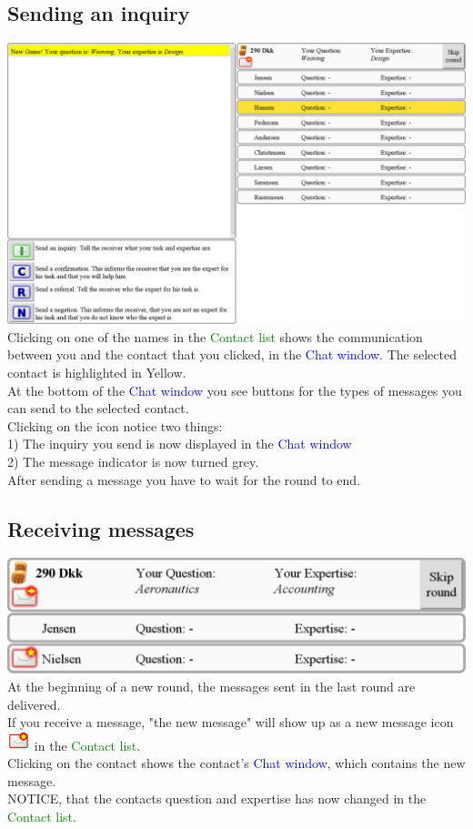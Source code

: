 \documentclass[a4paper,10pt]{article}
\begin{document}
 \subsection{Sending an inquiry}
 \includegraphics[width=\textwidth]{chatWindow.png}\\
Clicking on one of the names in the \textcolor{green}{Contact list} shows the communication between you and the contact that you clicked, in the \textcolor{blue}{Chat window}.
The selected contact is highlighted in Yellow. \\ 
At the bottom of the \textcolor{blue}{Chat window} you see buttons for the types of messages you can send to the selected contact.\\       
Clicking on the icon notice two things: \\
1) The inquiry you send is now displayed in the \textcolor{blue}{Chat window}\\
2) The message indicator is now turned grey.\\
After sending a message you have to wait for the round to end.
 \subsection{Receiving messages}
  \includegraphics[width=\textwidth]{receiveMessageContactList.pdf}\\
At the beginning of a new round, the messages sent in the last round are delivered.\\ 
If you receive a message, "the new message" will show up as a new message icon \includegraphics[width=0.05\textwidth]{Unread.pdf} in the \textcolor{green}{Contact list}.\\
Clicking on the contact shows the contact's \textcolor{blue}{Chat window}, which contains the new message.\\
NOTICE, that the contacts question and expertise has now changed in the \textcolor{green}{Contact list}.  
\end{document}
